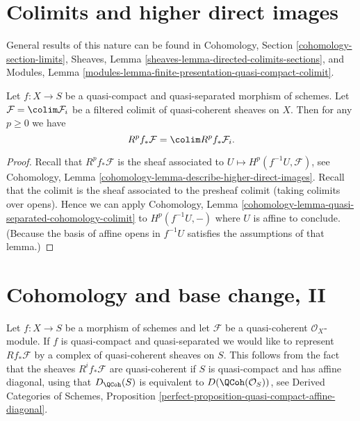 





\section{Colimits and higher direct images}
\label{section-colimits}

\noindent
General results of this nature can be found in
Cohomology, Section \ref{cohomology-section-limits},
Sheaves, Lemma \ref{sheaves-lemma-directed-colimits-sections}, and
Modules, Lemma \ref{modules-lemma-finite-presentation-quasi-compact-colimit}.

\begin{lemma}
\label{lemma-colimit-cohomology}
Let $f : X \to S$ be a quasi-compact and quasi-separated morphism of schemes.
Let $\mathcal{F} = \colim \mathcal{F}_i$ be a filtered colimit
of quasi-coherent sheaves on $X$.
Then for any $p \geq 0$ we have
$$
R^pf_*\mathcal{F} = \colim R^pf_*\mathcal{F}_i.
$$
\end{lemma}

\begin{proof}
Recall that $R^pf_*\mathcal{F}$ is the sheaf associated to
$U \mapsto H^p(f^{-1}U, \mathcal{F})$, see
Cohomology, Lemma \ref{cohomology-lemma-describe-higher-direct-images}.
Recall that the colimit is the sheaf associated to the presheaf colimit
(taking colimits over opens). Hence we can apply
Cohomology, Lemma \ref{cohomology-lemma-quasi-separated-cohomology-colimit}
to $H^p(f^{-1}U, -)$ where $U$ is affine to conclude. (Because the
basis of affine opens in $f^{-1}U$ satisfies the assumptions of that
lemma.)
\end{proof}










\section{Cohomology and base change, II}
\label{section-cohomology-and-base-change-derived}

\noindent
Let $f : X \to S$ be a morphism of schemes and let $\mathcal{F}$
be a quasi-coherent $\mathcal{O}_X$-module. If $f$ is quasi-compact
and quasi-separated we would like to represent $Rf_*\mathcal{F}$
by a complex of quasi-coherent sheaves on $S$. This follows
from the fact that the sheaves $R^if_*\mathcal{F}$ are quasi-coherent
if $S$ is quasi-compact and has affine diagonal,
using that $D_\QCoh(S)$ is equivalent to
$D(\QCoh(\mathcal{O}_S))$, see
Derived Categories of Schemes, Proposition
\ref{perfect-proposition-quasi-compact-affine-diagonal}.

